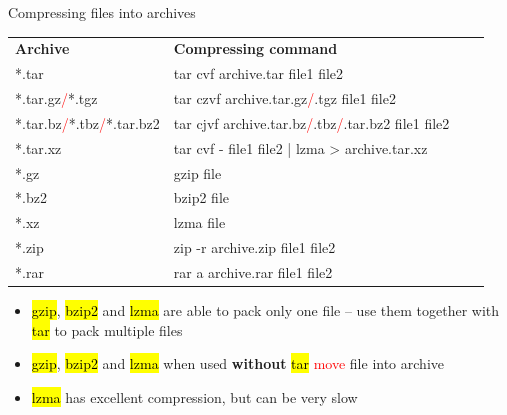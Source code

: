 \documentclass[compress, ucs, xelatex, 11pt, xcolor=svgnames,
  hyperref={
    bookmarks=true,
    unicode=true,
    colorlinks=true,
    pdftitle={Linux, command line and MetaCentrum},
    plainpages=false,
    pdfauthor={Vojtech Zeisek},
    pdfsubject={Course about use of Linux command line, writing shell scripts and using MetaCentrum of CESNET},
    pdfcreator={XeLaTeX},
    pdfkeywords={Linux, GNU, BASH, shell, command line, MetaCentrum},
    linkcolor=DarkRed,
    anchorcolor=DarkBlue,
    citecolor=Indigo,
    filecolor=NavyBlue,
    menucolor=DarkMagenta,
    urlcolor=DarkBlue,
    pdftex},
  url={hyphens, lowtilde} %
  ]{beamer}
\renewcommand{\texttt}[1]{\hl{\ttfamily #1}}
\renewcommand{\alert}[1]{\textcolor{red}{#1}}
\begin{document}
\begin{frame}{Compressing files into archives}
  \begin{center}
    \begin{tabular}{llll}
      \textbf{Archive} & \textbf{Compressing command}\\
      *.tar & tar cvf archive.tar file1 file2\\
      *.tar.gz\alert{/}*.tgz & tar czvf archive.tar.gz\alert{/}.tgz file1 file2\\
      *.tar.bz\alert{/}*.tbz\alert{/}*.tar.bz2 & tar cjvf archive.tar.bz\alert{/}.tbz\alert{/}.tar.bz2 file1 file2\\
      *.tar.xz & tar cvf - file1 file2 | lzma > archive.tar.xz\\
      *.gz & gzip file\\
      *.bz2 & bzip2 file\\
      *.xz & lzma file\\
      *.zip & zip -r archive.zip file1 file2\\
      *.rar & rar a archive.rar file1 file2
    \end{tabular}
  \end{center}
  \begin{itemize}
    \item \texttt{gzip}, \texttt{bzip2} and \texttt{lzma} are able to pack only one file -- use them together with \texttt{tar} to pack multiple files
    \item \texttt{gzip}, \texttt{bzip2} and \texttt{lzma} when used \textbf{without} \texttt{tar} \alert{move} file into archive
    \item \texttt{lzma} has excellent compression, but can be very slow
  \end{itemize}
\end{frame}
\end{document}
